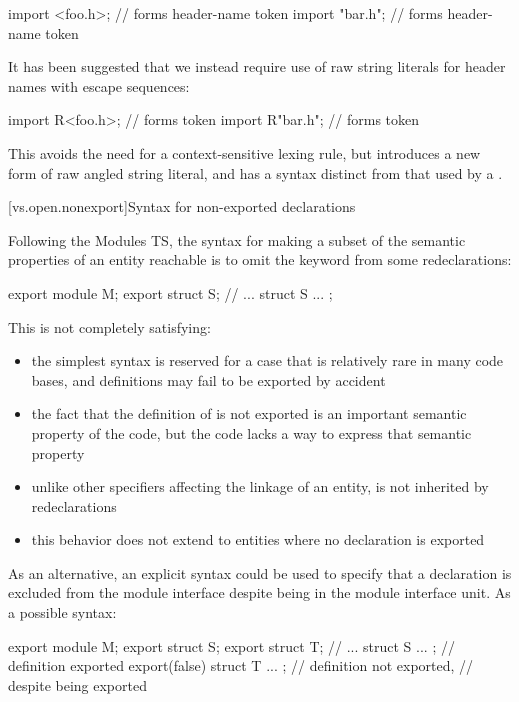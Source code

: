 \begin{codeblock}
import <foo.h>;       // forms  header-name token
import "bar\baz.h";   // forms  header-name token
\end{codeblock}

\pnum
It has been suggested that we instead require use of
raw string literals for header names with escape sequences:

\begin{codeblock}
import R<foo.h>;       // forms  token
import R"bar\baz.h";   // forms  token
\end{codeblock}

This avoids the need for a context-sensitive lexing rule,
but introduces a new form of raw angled string literal,
and has a  syntax distinct from
that used by a .

[vs.open.nonexport]{Syntax for non-exported declarations}

\pnum
Following the Modules TS,
the syntax for making a subset
of the semantic properties of an entity reachable
is to omit the  keyword
from some redeclarations:

\begin{codeblock}
export module M;
export struct S;
// ...
struct S { ... };
\end{codeblock}

\pnum
This is not completely satisfying:
\begin{itemize}
\item the simplest syntax is reserved for a case that is
relatively rare in many code bases, and definitions may
fail to be exported by accident
\item the fact that the definition of  is not exported
is an important semantic property of the code,
but the code lacks a way to express that semantic property
\item unlike other specifiers affecting the linkage
of an entity,  is not inherited by redeclarations
\item this behavior does not extend to entities where
no declaration is exported
\end{itemize}

As an alternative, an explicit syntax could be used
to specify that a declaration is excluded from the module interface
despite being in the module interface unit.
As a possible syntax:

\begin{codeblock}
export module M;
export struct S;
export struct T;
// ...
struct S { ... };                    // definition exported
export(false) struct T { ... };      // definition not exported,
                                     // despite  being exported
\end{codeblock}
